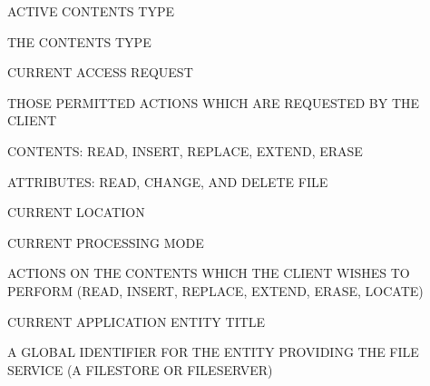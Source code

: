 \begin{bwslide}

\begin{nrtc}
\item	ACTIVE CONTENTS TYPE
    \begin{nrtc}
    \item	THE CONTENTS TYPE
    \end{nrtc}

\item	CURRENT ACCESS REQUEST
    \begin{nrtc}
    \item	THOSE PERMITTED ACTIONS WHICH ARE REQUESTED BY THE CLIENT

    \item	CONTENTS: READ, INSERT, REPLACE, EXTEND, ERASE

    \item	ATTRIBUTES: READ, CHANGE, AND DELETE FILE
    \end{nrtc}

\item	CURRENT LOCATION

\item	CURRENT PROCESSING MODE
    \begin{nrtc}
    \item	ACTIONS ON THE CONTENTS WHICH THE CLIENT WISHES TO PERFORM
		(READ, INSERT, REPLACE, EXTEND, ERASE, LOCATE)
    \end{nrtc}
	
\item	CURRENT APPLICATION ENTITY TITLE
    \begin{nrtc}
    \item	A GLOBAL IDENTIFIER FOR THE ENTITY PROVIDING THE FILE SERVICE
		(A FILESTORE OR FILESERVER)
    \end{nrtc}
\end{nrtc}
\end{bwslide}


